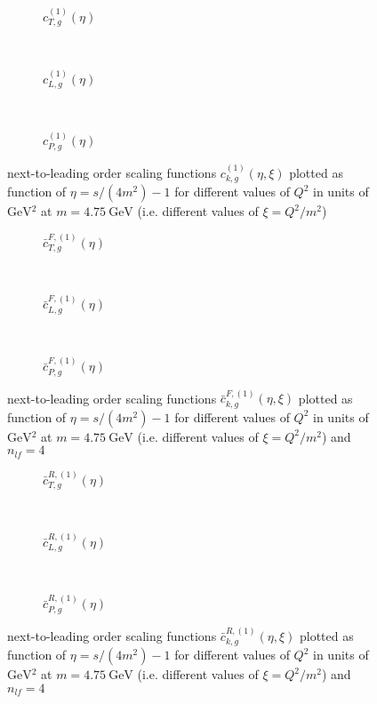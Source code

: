 \pagebreak
\begin{figure}[ht!]
\centering
\begin{subfigure}[t]{\textwidth}
	
	\caption{$c_{T,g}^{(1)}(\eta)$}
\end{subfigure}\\%
\begin{subfigure}[t]{\textwidth}
	
	\caption{$c_{L,g}^{(1)}(\eta)$}
\end{subfigure}\\%
\begin{subfigure}[t]{\textwidth}
	
	\caption{$c_{P,g}^{(1)}(\eta)$}
\end{subfigure}
\caption{next-to-leading order scaling functions $c_{k,g}^{(1)}(\eta,\xi)$ plotted as function of $\eta=s/(4m^2)-1$ for different values of $Q^2$ in units of $\si{\GeV^2}$ at $m=\SI{4.75}{\GeV}$ (i.e. different values of $\xi=Q^2/m^2$) }\label{fig:cg1}
\end{figure}

\pagebreak
\begin{figure}[ht!]
\centering
\begin{subfigure}[t]{\textwidth}
	
	\caption{$\bar c_{T,g}^{F,(1)}(\eta)$}
\end{subfigure}\\%
\begin{subfigure}[t]{\textwidth}
	
	\caption{$\bar c_{L,g}^{F,(1)}(\eta)$}
\end{subfigure}\\%
\begin{subfigure}[t]{\textwidth}
	
	\caption{$\bar c_{P,g}^{F,(1)}(\eta)$}
\end{subfigure}
\caption{next-to-leading order scaling functions $\bar c_{k,g}^{F,(1)}(\eta,\xi)$ plotted as function of $\eta=s/(4m^2)-1$ for different values of $Q^2$ in units of $\si{\GeV^2}$ at $m=\SI{4.75}{\GeV}$ (i.e. different values of $\xi=Q^2/m^2$) and $n_{lf}=4$ }\label{fig:cg1}
\end{figure}

\pagebreak
\begin{figure}[ht!]
\centering
\begin{subfigure}[t]{\textwidth}
	
	\caption{$\bar c_{T,g}^{R,(1)}(\eta)$}
\end{subfigure}\\%
\begin{subfigure}[t]{\textwidth}
	
	\caption{$\bar c_{L,g}^{R,(1)}(\eta)$}
\end{subfigure}\\%
\begin{subfigure}[t]{\textwidth}
	
	\caption{$\bar c_{P,g}^{R,(1)}(\eta)$}
\end{subfigure}
\caption{next-to-leading order scaling functions $\bar c_{k,g}^{R,(1)}(\eta,\xi)$ plotted as function of $\eta=s/(4m^2)-1$ for different values of $Q^2$ in units of $\si{\GeV^2}$ at $m=\SI{4.75}{\GeV}$ (i.e. different values of $\xi=Q^2/m^2$) and $n_{lf}=4$ }\label{fig:cg1}
\end{figure}

\clearpage
